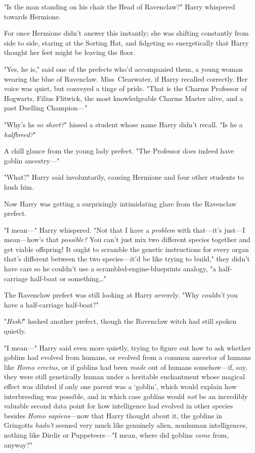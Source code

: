 "Is the man standing on his chair the Head of Ravenclaw?" Harry whispered
towards Hermione.

For once Hermione didn't answer this instantly; she was shifting constantly
from side to side, staring at the Sorting Hat, and fidgeting so energetically
that Harry thought her feet might be leaving the floor.

"Yes, he is," said one of the prefects who'd accompanied them, a young woman
wearing the blue of Ravenclaw. Miss~Clearwater, if Harry recalled correctly.
Her voice was quiet, but conveyed a tinge of pride. "That is the Charms
Professor of Hogwarts, Filius Flitwick, the most knowledgeable Charms Master
alive, and a past Duelling Champion---"

"Why's he so \emph{short?}" hissed a student whose name Harry didn't recall.
"Is he a \emph{halfbreed?}"

A chill glance from the young lady prefect. "The Professor does indeed have
goblin ancestry---"

"What?" Harry said involuntarily, causing Hermione and four other students to
hush him.

Now Harry was getting a surprisingly intimidating glare from the Ravenclaw
prefect.

"I mean---" Harry whispered. "Not that I have a \emph{problem} with that---it's
just---I mean---how's that \emph{possible?} You can't just mix two different
species together and get viable offspring! It ought to scramble the genetic
instructions for every organ that's different between the two species---it'd be
like trying to build," they didn't have cars so he couldn't use a
scrambled-engine-blueprints analogy, "a half-carriage half-boat or
something…"

The Ravenclaw prefect was still looking at Harry severely. "Why \emph{couldn't}
you have a half-carriage half-boat?"

"\emph{Hssh!}" hsshed another prefect, though the Ravenclaw witch had still
spoken quietly.

"I mean---" Harry said even more quietly, trying to figure out how to ask
whether goblins had evolved from humans, or evolved from a common ancestor of
humans like \emph{Homo erectus}, or if goblins had been \emph{made} out of
humans somehow---if, say, they were still genetically human under a heritable
enchantment whose magical effect was diluted if only one parent was a `goblin',
which would explain how interbreeding was possible, and in which case goblins
would \emph{not} be an incredibly valuable second data point for how
intelligence had evolved in other species besides \emph{Homo sapiens}---now
that Harry thought about it, the goblins in Gringotts \emph{hadn't} seemed very
much like genuinely alien, nonhuman intelligences, nothing like Dirdir or
Puppeteers---"I mean, where did goblins \emph{come} from, anyway?"

